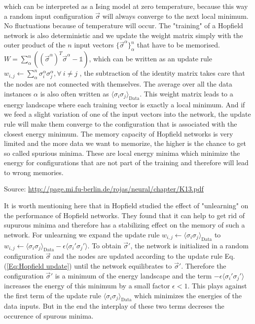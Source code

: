 \documentclass[nofootinbib, superscriptaddress, prl]{revtex4}
\begin{document}
which can be interpreted as a Ising model at zero temperature, because this way a random input configuration $\vec{\sigma}$ will always converge to the next local minimum. No fluctuations because of temperature will occur. 
The "training" of a Hopfield network is also deterministic and we update the weight matrix simply with the outer product of the $n$ input vectors $\{ \vec{\sigma}^{\alpha}\}_{\alpha}^n$ that have to be memorised. $W = \sum_{\alpha}^n( (\vec{\sigma}^{\alpha})^T \vec{\sigma}^{\alpha} - \mathbb{1}) $, which can be written as an update rule $w_{i,j} \leftarrow \sum_{\alpha}^n \sigma_i^{\alpha} \sigma_j^{\alpha}, \forall~i \neq j$
, the subtraction of the identity matrix takes care that the nodes are not connected with themselves. The average over all the data instances $\alpha$ is also often written as $\langle \sigma_i \sigma_j \rangle_{\text{Data}}$.
This weight matrix leads to a energy landscape where each training vector is exactly a local minimum. And if we feed a slight variation of one of the input vectors into the network, the update rule will make them converge to the configuration that is associated with the closest energy minimum. 
The memory capacity of Hopfield networks is very limited and the more data we want to memorize, the higher is the chance to get so called spurious minima. These are local energy minima which minimize the energy for configurations that are not part of the training and therefore will lead to wrong memories. 

Source: \url{http://page.mi.fu-berlin.de/rojas/neural/chapter/K13.pdf}

It is worth mentioning here that in \cite{hopfield1983unlearning} Hopfield studied the effect of "unlearning" on the performance of Hopfield networks. They found that it can help to get rid of supurous minima and therefore has a stabilizing effect on the memory of such a network. 
For unlearning we expand the update rule $w_{i,j} \leftarrow \langle \sigma_i \sigma_j \rangle_{\text{Data}}$ to  $w_{i,j} \leftarrow \langle \sigma_i \sigma_j \rangle_{\text{Data}} - \epsilon \langle \sigma_i' \sigma_j' \rangle$. To obtain $\vec{\sigma}'$, the network is initialized in a random configuration $\vec{\sigma}$ and the nodes are updated according to the update rule Eq. (\ref{Eq:Hopfield update}) until the network equilibrates to $\vec{\sigma}'$. Therefore the configuration $\vec{\sigma}'$ is a minimum of the energy landscape and the term $- \epsilon \langle \sigma_i' \sigma_j' \rangle$ increases the energy of this minimum by a small factor $\epsilon<1$. This plays against the first term of the update rule $\langle \sigma_i \sigma_j \rangle_{\text{Data}}$ which minimizes the energies of the data inputs. But in the end the interplay of these two terms decreses the occurence of spurous minima.
\end{document}
